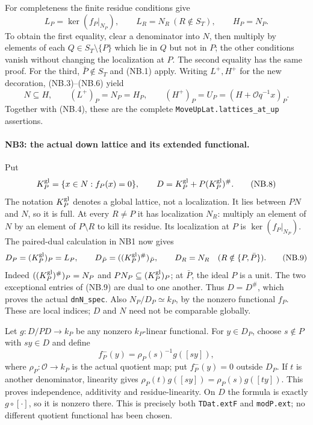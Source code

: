 For completeness the finite residue conditions give
\[
 L_P=\ker(f_P|_{N_P}),\qquad L_R=N_R\ (R\notin S_T),
 \qquad H_P=N_P.                                     \tag{NB.6}
\]
To obtain the first equality, clear a denominator into $N$, then
multiply by elements of each $Q\in S_T\setminus\{P\}$ which lie in
$Q$ but not in $P$; the other conditions vanish without changing the
localization at $P$. The second equality has the same proof. For the
third, $\bar P\notin S_T$ and (NB.1) apply. Writing $L^+,H^+$ for the
new decoration, (NB.3)--(NB.6) yield
\[
 N\subseteq H,\qquad (L^+)_P=N_P=H_P,\qquad
 (H^+)_P=U_P=(H+\mathcal Oq^{-1}x)_P.                \tag{NB.7}
\]
Together with (NB.4), these are the complete
\texttt{MoveUpLat.lattices\_at\_up} assertions.

\paragraph{NB3: the actual down lattice and its extended functional.}
Put
\[
 K_P^{\rm gl}=\{x\in N:f_P(x)=0\},\qquad
 D=K_P^{\rm gl}+P(K_P^{\rm gl})^\# .                 \tag{NB.8}
\]
The notation $K_P^{\rm gl}$ denotes a global lattice, not a localization.
It lies between $PN$ and $N$, so it is full. At every $R\ne P$ it has
localization $N_R$: multiply an element of $N$ by an element of
$P\setminus R$ to kill its residue. Its localization at $P$ is
$\ker(f_P|_{N_P})$. The paired-dual calculation in NB1 now gives
\[
 D_P=(K_P^{\rm gl})_P=L_P,\qquad
 D_{\bar P}=((K_P^{\rm gl})^\#)_{\bar P},\qquad
 D_R=N_R\quad(R\notin\{P,\bar P\}).                 \tag{NB.9}
\]
Indeed $((K_P^{\rm gl})^\#)_P=N_P$ and
$PN_P\subseteq(K_P^{\rm gl})_P$; at $\bar P$, the ideal $P$ is a unit.
The two exceptional entries of (NB.9) are dual to one another.
Thus $D=D^\#$, which proves the actual \texttt{dnN\_spec}.
Also $N_P/D_P\simeq k_P$, by the nonzero functional $f_P$.
These are local indices; $D$ and $N$ need not be comparable globally.

Let $g:D/PD\to k_P$ be any nonzero $k_P$-linear functional. For
$y\in D_P$, choose $s\notin P$ with $sy\in D$ and define
\[
 f_P^-(y)=\rho_P(s)^{-1}g([sy]),                     \tag{NB.10}
\]
where $\rho_P:\mathcal O\to k_P$ is the actual quotient map;
put $f_P^-(y)=0$ outside $D_P$. If $t$ is another denominator,
linearity gives $\rho_P(t)g([sy])=\rho_P(s)g([ty])$.
This proves independence, additivity and residue-linearity. On $D$
the formula is exactly $g\circ[\cdot]$, so it is nonzero there.
This is precisely both \texttt{TDat.extF} and \texttt{modP.ext};
no different quotient functional has been chosen.

